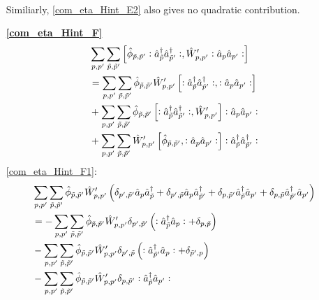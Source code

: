 \begin{appendix}
\begin{itemize}
\begin{align}
\end{align}
Similiarly, \ref{com_eta_Hint_E2} also gives no quadratic contribution.
\item[\textbf{\ref{com_eta_Hint_F}}] 
\begin{subequations}
\begin{align}
&\sum\limits_{p, p^\prime}\sum\limits_{\tilde p,\tilde p^\prime} \left[\hat\phi_{\tilde p,\tilde p^\prime}\vcentcolon\hat a^\dagger_{\tilde p}\hat a^\dagger_{\tilde p^\prime}\vcentcolon,\hat W_{p,p^\prime}^\prime\vcentcolon\hat a_p\hat a_{p^\prime}\vcentcolon\right]\nonumber\\
&=\sum\limits_{p, p^\prime}\sum\limits_{\tilde p,\tilde p^\prime} \hat\phi_{\tilde p,\tilde p^\prime}\hat W_{p,p^\prime}^\prime\left[\vcentcolon\hat a^\dagger_{\tilde p}\hat a^\dagger_{\tilde p^\prime}\vcentcolon,\vcentcolon\hat a_p\hat a_{p^\prime}\vcentcolon\right]\label{com_eta_Hint_F1}\\
&+\sum\limits_{p, p^\prime}\sum\limits_{\tilde p,\tilde p^\prime}\hat\phi_{\tilde p,\tilde p^\prime} \left[\vcentcolon\hat a^\dagger_{\tilde p}\hat a^\dagger_{\tilde p^\prime}\vcentcolon,\hat W_{p,p^\prime}^\prime\right]\vcentcolon\hat a_p\hat a_{p^\prime}\vcentcolon\label{com_eta_Hint_F2}\\
&+\sum\limits_{p, p^\prime}\sum\limits_{\tilde p,\tilde p^\prime}\hat W_{p,p^\prime}^\prime \left[\hat\phi_{\tilde p,\tilde p^\prime},\vcentcolon\hat a_p\hat a_{p^\prime}\vcentcolon\right]\vcentcolon\hat a^\dagger_{\tilde p}\hat a^\dagger_{\tilde p^\prime}\vcentcolon\label{com_eta_Hint_F3}
\end{align}
\end{subequations}
\ref{com_eta_Hint_F1}:
\begin{align}
&\Sum_{p, p^\prime}\Sum_{\tilde p,\tilde p^\prime} \hat\phi_{\tilde p,\tilde p^\prime}\hat W_{p,p^\prime}^\prime\left(\delta_{p^\prime,\tilde p^\prime}\AN_p\CR_{\tilde p}+\delta_{p^\prime,\tilde p}\AN_p\CR_{\tilde p^\prime}+\delta_{p,\tilde p^\prime}\CR_{\tilde p}\AN_{p^\prime}+\delta_{p,\tilde p}\CR_{\tilde p^\prime}\AN_{p^\prime}\right)\nonumber\\
&=-\Sum_{p, p^\prime}\Sum_{\tilde p,\tilde p^\prime} \hat\phi_{\tilde p,\tilde p^\prime}\hat W_{p,p^\prime}^\prime \delta_{p^\prime,\tilde p^\prime}\left(\NO\CR_{\tilde p}\AN_p\NO+\delta_{p,\tilde p}\right) \\
&-\Sum_{p, p^\prime}\Sum_{\tilde p,\tilde p^\prime} \hat\phi_{\tilde p,\tilde p^\prime}\hat W_{p,p^\prime}^\prime \delta_{p^\prime,\tilde p}\left(\NO\CR_{\tilde p^\prime}\AN_p\NO+\delta_{\tilde p^\prime,p}\right) \nonumber\\
&-\Sum_{p, p^\prime}\Sum_{\tilde p,\tilde p^\prime} \hat\phi_{\tilde p,\tilde p^\prime}\hat W_{p,p^\prime}^\prime \delta_{p,\tilde p^\prime}\NO\CR_{\tilde p}\AN_{p^\prime}\NO \nonumber\\

\end{align}
\end{itemize}
\end{appendix}
